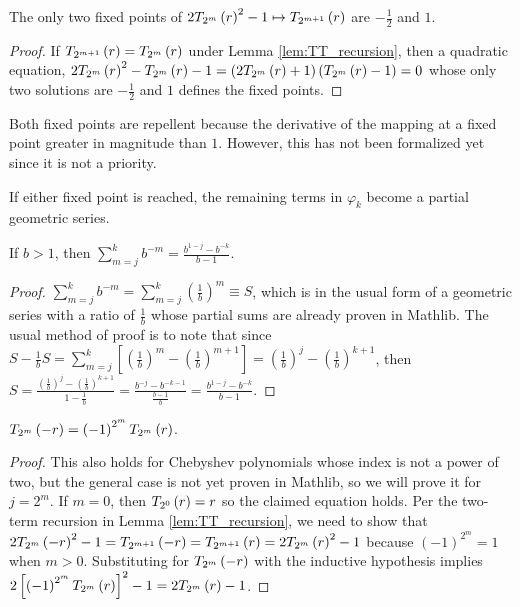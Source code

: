\begin{lemma}
  \label{lem:fixed_points}
  \leanok
  The only two fixed points of $2 \TT[r]{m}^2 - 1 \mapsto \TT[r]{m + 1}$ are $-\frac{1}{2}$ and $1$.
\end{lemma}

\begin{proof}
  \leanok
  If $\TT[r]{m + 1} = \TT[r]{m}$ under Lemma \ref{lem:TT_recursion}, then a quadratic equation, $2 \TT[r]{m}^2 - \TT[r]{m} - 1 = \left(2\TT[r]{m} + 1\right)\left(\TT[r]{m} - 1\right)  = 0$ whose only two solutions are $-\frac{1}{2}$ and $1$ defines the fixed points.
\end{proof}
\begin{remark*}
Both fixed points are repellent because the derivative of the mapping at a fixed point greater in magnitude than $1$. However, this has not been formalized yet since it is not a priority.
\end{remark*}
\noindent If either fixed point is reached, the remaining terms in $\varphi_k$ become a partial geometric series.
\begin{lemma}
  \label{lem:geom_sum_neg_pow}
  If $b > 1$, then $\sum\limits_{m = j}^k b^{-m} = \frac{b^{1 - j} - b^{-k}}{b - 1}$.
\end{lemma}
\begin{proof}
  \leanok
  $\sum\limits_{m = j}^k b^{-m} = \sum\limits_{m = j}^k \left(\frac{1}{b}\right)^m \equiv S$, which is in the usual form of a geometric series with a ratio of $\frac{1}{b}$ whose partial sums are already proven in Mathlib. The usual method of proof is to note that since $S - \frac{1}{b} S = \sum\limits_{m = j}^k \left[\left(\frac{1}{b}\right)^m - \left(\frac{1}{b}\right)^{m + 1}\right] = \left(\frac{1}{b}\right)^j - \left(\frac{1}{b}\right)^{k + 1}$, then $S = \frac{\left(\frac{1}{b}\right)^j - \left(\frac{1}{b}\right)^{k + 1}}{1 - \frac{1}{b}} = \frac{b^{-j} - b^{-k - 1}}{\frac{b - 1}{b}} = \frac{b^{1 - j} - b^{-k}}{b - 1}$.
\end{proof}

\begin{lemma}[Symmetry]
  \label{lem:symmetry}
  $\TT[-r]{m} = \left(-1\right)^{2^m} \TT[r]{m}$.
\end{lemma}
\begin{proof}
  This also holds for Chebyshev polynomials whose index is not a power of two, but the general case is not yet proven in Mathlib, so we will prove it for $j = 2^m$. If $m = 0$, then $\TT[r]{0} = r$ so the claimed equation holds. Per the two-term recursion in Lemma \ref{lem:TT_recursion}, we need to show that $2\TT[-r]{m}^2 - 1 = \TT[-r]{m + 1} = \TT[r]{m + 1} = 2\TT[r]{m}^2 - 1$ because $\left(-1\right)^{2^m} = 1$ when $m > 0$.  Substituting for $\TT[-r]{m}$ with the inductive hypothesis implies $2\left[\left(-1\right)^{2^m} \TT[r]{m}\right]^2 - 1 =  2\TT[r]{m} - 1$.
\end{proof}

